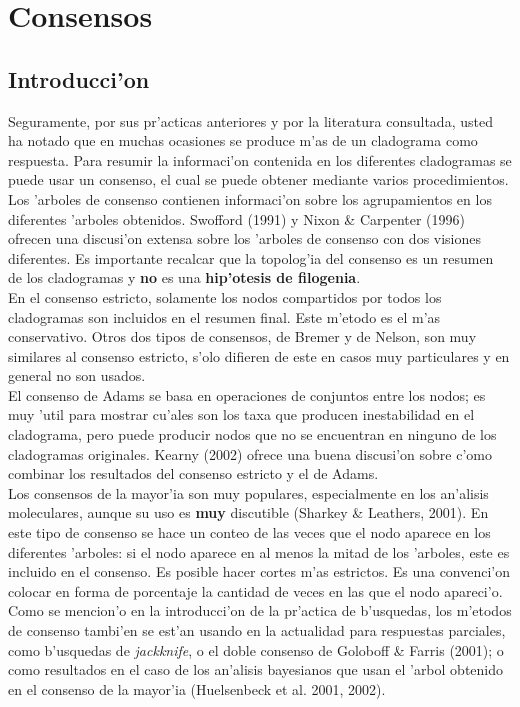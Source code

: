\chapter{Consensos}
\section*{Introducci'on}
Seguramente, por sus pr'acticas anteriores y por la literatura consultada, usted ha notado que en muchas ocasiones se produce m'as de un cladograma como respuesta. Para resumir la informaci'on contenida en los diferentes cladogramas se puede usar un consenso, el cual se puede obtener mediante varios procedimientos. Los 'arboles de consenso contienen informaci'on sobre los agrupamientos en los diferentes 'arboles obtenidos. Swofford (1991) y Nixon \& Carpenter (1996) ofrecen una discusi'on extensa sobre los 'arboles de consenso con dos visiones diferentes. Es importante recalcar que la topolog'ia del consenso es un resumen de los cladogramas y \textbf{no} es una \textbf{hip'otesis de filogenia}.\\
En el consenso estricto, solamente los nodos compartidos por todos los cladogramas son incluidos en el resumen final. Este m'etodo es el m'as conservativo. Otros dos tipos de consensos, de Bremer y de Nelson, son muy similares al consenso estricto, s'olo difieren de este en casos muy particulares y en general no son usados.\\
El consenso de Adams se basa en operaciones de conjuntos entre los nodos; es muy 'util para mostrar cu'ales son los taxa que producen inestabilidad en el cladograma, pero puede producir nodos que no se encuentran en ninguno de los cladogramas originales. Kearny (2002) ofrece una buena discusi'on sobre c'omo combinar los resultados del consenso estricto y el de Adams.\\
Los consensos de la mayor'ia son muy populares, especialmente en los an'alisis moleculares, aunque su uso es \textbf{muy} discutible (Sharkey \& Leathers, 2001). En este tipo de consenso se hace un conteo de las veces que el nodo aparece en los diferentes 'arboles: si el nodo aparece en al menos la mitad de los 'arboles, este es incluido en el consenso. Es posible hacer cortes m'as estrictos. Es una convenci'on colocar en forma de porcentaje la cantidad de veces en las que el nodo apareci'o.\\
Como se mencion'o en la introducci'on de la pr'actica de b'usquedas, los m'etodos de consenso tambi'en se est'an usando en la actualidad para respuestas parciales, como b'usquedas de \textit{jackknife}, o el doble consenso de Goloboff \& Farris (2001); o como resultados en el caso de los an'alisis bayesianos que usan el 'arbol obtenido en el consenso de la mayor'ia (Huelsenbeck et al. 2001, 2002).

